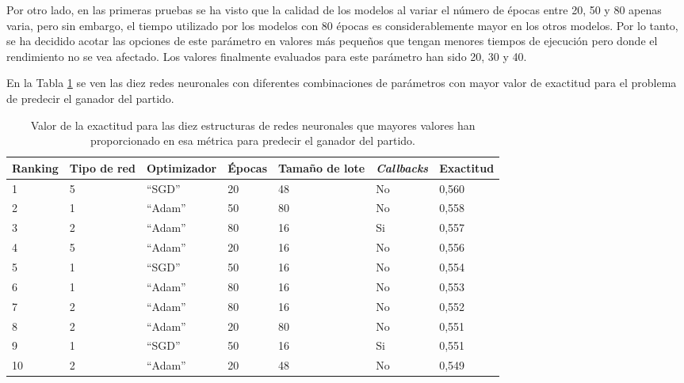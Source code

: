 Por otro lado, en las primeras pruebas se ha visto que la calidad de los modelos al variar el número de épocas entre 20, 50 y 80 apenas varia, pero sin embargo, el tiempo utilizado por los modelos con 80 épocas es considerablemente mayor en los otros modelos. Por lo tanto, se ha decidido acotar las opciones de este parámetro en valores más pequeños que tengan menores tiempos de ejecución pero donde el rendimiento no se vea afectado. Los valores finalmente evaluados para este parámetro han sido 20, 30 y 40.

En la Tabla \ref{table:exactitud-redes-ganador} se ven las diez redes neuronales con diferentes combinaciones de parámetros con mayor valor de exactitud para el problema de predecir el ganador del partido.

\begin{table}[]
    \centering
    \begin{tabular}{|l|l|l|l|l|l|l|}
        \hline
        \rowcolor[HTML]{C0C0C0}
        Ranking & Tipo de red & Optimizador & Épocas & Tamaño de lote & \textit{Callbacks} & Exactitud \\ \hline
        1                & 5           & ``SGD''         & 20     & 48         & No        & 0,560     \\ \hline
        2                & 1           & ``Adam''        & 50     & 80         & No        & 0,558     \\ \hline
        3                & 2           & ``Adam''        & 80     & 16         & Si        & 0,557     \\ \hline
        4                & 5           & ``Adam''        & 20     & 16         & No        & 0,556     \\ \hline
        5                & 1           & ``SGD''         & 50     & 16         & No        & 0,554     \\ \hline
        6                & 1           & ``Adam''        & 80     & 16         & No        & 0,553     \\ \hline
        7                & 2           & ``Adam''        & 80     & 16         & No        & 0,552     \\ \hline
        8                & 2           & ``Adam''        & 20     & 80         & No        & 0,551     \\ \hline
        9                & 1           & ``SGD''         & 50     & 16         & Si        & 0,551     \\ \hline
        10               & 2           & ``Adam''        & 20     & 48         & No        & 0,549     \\ \hline
    \end{tabular}
    \caption{Valor de la exactitud para las diez estructuras de redes neuronales que mayores valores han proporcionado en esa métrica para predecir el ganador del partido.}
    \label{table:exactitud-redes-ganador}
\end{table}



